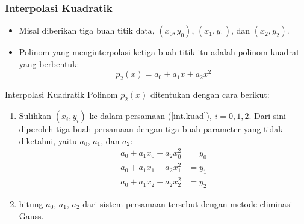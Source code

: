 \documentclass[pdflatex,compress,mathserif]{beamer}
\begin{document}
\begin{frame}
	\frametitle{Interpolasi Kuadratik}
	\begin{itemize}
		\item Misal diberikan tiga buah titik data, $ (x_0, y_0) $, $ (x_1, y_1 ) $, dan $ (x_2, y_2) $.
		\item Polinom yang menginterpolasi ketiga buah titik itu adalah polinom kuadrat yang berbentuk:
		\begin{equation}\label{int.kuad}
			p_2(x) = a_0 + a_1x + a_2 x^2
		\end{equation}
	\end{itemize}
\end{frame}

\begin{frame}{Interpolasi Kuadratik}
	Polinom $ p_2(x) $ ditentukan dengan cara berikut:
	\begin{enumerate}
		\item Sulihkan $ (x_i, y_i) $ ke dalam persamaan (\ref{int.kuad}), $ i = 0, 1, 2 $. Dari sini diperoleh tiga buah persamaan dengan tiga buah parameter yang tidak diketahui, yaitu $ a_0 $, $ a_1 $, dan $ a_2 $:
		\begin{align*}
			a_0 + a_1 x_0 + a_2 x_0^2 &= y_0\\
			a_0 + a_1 x_1 + a_2 x_1^2 &= y_1\\
			a_0 + a_1 x_2 + a_2 x_2^2 &= y_2
		\end{align*}
		\item hitung $ a_0 $, $ a_1 $, $ a_2 $ dari sistem persamaan tersebut dengan metode eliminasi Gauss.
	\end{enumerate}
\end{frame}
\end{document}
